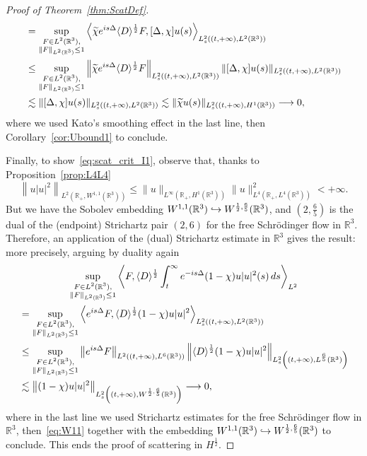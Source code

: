 \documentclass[10pt]{amsart}
\theoremstyle{definition}\newtheorem{defi}[theo]{Definition}\newtheorem{rema}[theo]{Remark}\newtheorem{exam}[theo]{Example}\newtheorem{exem}[theo]{Example}\newtheorem{nota}[theo]{Notation}
\newcommand*\R{\mathbb{R}}
\renewcommand*{\to}{\mathchoice{\longrightarrow}{\rightarrow}{\rightarrow}{\rightarrow}}
\newcommand{\longhookrightarrow}{\lhook\joinrel\longrightarrow}
\newcommand*{\hookto}{\mathchoice{\longhookrightarrow}{\hookrightarrow}{\hookrightarrow}{\hookrightarrow}}
\begin{document}
\begin{proof}[Proof of Theorem~\ref{thm:ScatDef}]
\begin{multline*}
\begin{aligned}
&= \sup_{\substack{F \in L^2(\R^3), \\ \| F \|_{L^2(\R^3)} \leq 1}} \left\langle \widetilde \chi e^{is\Delta}\langle D \rangle^{\frac 12} F, [\Delta, \chi] u(s) \right\rangle_{L_s^2((t, +\infty), L^2(\R^3))} \\
&\leq \sup_{\substack{F \in L^2(\R^3), \\ \| F \|_{L^2(\R^3)} \leq 1}} \left\| \widetilde \chi e^{is\Delta}\langle D \rangle^{\frac 12} F \right\|_{L_s^2\left((t, +\infty), L^2(\R^3)\right)} \| [\Delta, \chi] u(s) \| _{L_s^2\left((t, +\infty), L^2(\R^3)\right)} \\
&\lesssim \| [\Delta, \chi] u(s) \|_{L_s^2((t, +\infty), L^2(\R^3))} \lesssim \| \widetilde \chi u(s)\|_{L_s^2((t, +\infty),H^1(\R^3))} \to 0,
\end{aligned}
\end{multline*}
where we used Kato's smoothing effect in the last line, then Corollary~\ref{cor:Ubound1} to conclude.

Finally, to show~\eqref{eq:scat_crit_I1}, observe that, thanks to Proposition~\ref{prop:L4L4}
\begin{equation}\label{eq:W11}
\left\| u|u|^2 \right\|_{L^2\left(\R_+, W^{1, 1}(\R^3)\right)} \leq \| u \|_{L^\infty\left(\R_+, H^1(\R^3)\right)} \| u \|^2_{L^4(\R_+, L^4(\R^3))} < +\infty.
\end{equation}
But we have the Sobolev embedding $W^{1, 1} (\R^3)\hookto W^{\frac 12, \frac {6}{5}}(\R^3)$, and $(2, \frac {6}{5})$ is the dual of the (endpoint) Strichartz pair $(2, 6)$ for the free Schr{\"o}dinger flow in $\R^3$. Therefore, an application of the (dual) Strichartz estimate in $\R^3$ gives the result: more precisely, arguing by duality again
\begin{multline*}
\sup_{\substack{F \in L^2(\R^3), \\ \| F \|_{L^2(\R^3)} \leq 1}} \left\langle F, \langle D \rangle^{\frac 12} \int_t^\infty e^{-is\Delta} (1-\chi)u|u|^{2}(s) \, ds \right\rangle_{L^2} \\
\begin{aligned}
&= \sup_{\substack{F \in L^2(\R^3), \\ \| F \|_{L^2(\R^3)} \leq 1}} \left\langle e^{is\Delta} F, \langle D \rangle^{\frac 12}(1-\chi)u|u|^{2} \right\rangle_{L_s^2((t, +\infty), L^2(\R^3))} \\
&\leq \sup_{\substack{F \in L^2(\R^3), \\ \| F \|_{L^2(\R^3)} \leq 1}} \left\| e^{is\Delta} F\right\|_{L^2((t, +\infty), L^6(\R^3))} \left\| \langle D \rangle^{\frac 12} (1-\chi)u|u|^{2}\right\|_{L_s^2\left((t, +\infty), L^{\frac 65}(\R^3)\right)} \\
&\lesssim \left\| (1-\chi)u|u|^{2}\right\| _{L_s^2\left((t, +\infty), W^{\frac 12, \frac 65}(\R^3)\right)} \to 0,
\end{aligned}
\end{multline*}
where in the last line we used Strichartz estimates for the free Schr{\"o}dinger flow in $\R^3$, then~\eqref{eq:W11} together with the embedding $W^{1, 1}(\R^3) \hookto W^{\frac 12, \frac {6}{5}}(\R^3)$ to conclude. This ends the proof of scattering in $H^{\frac 12}$.


\end{proof}
\end{document}
